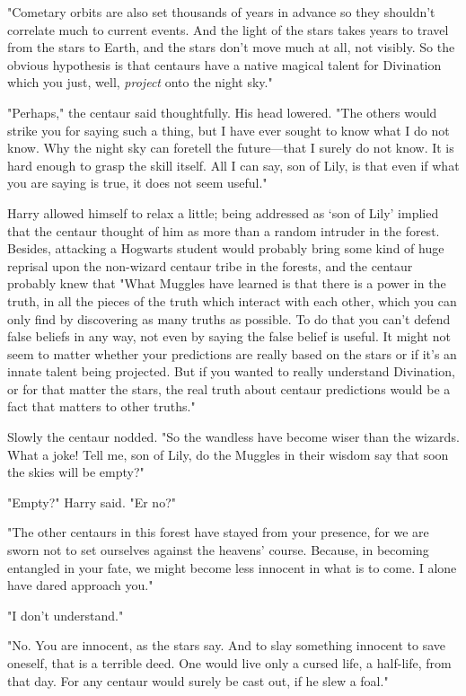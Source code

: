 "Cometary orbits are also set thousands of years in advance so they shouldn't
correlate much to current events. And the light of the stars takes years to
travel from the stars to Earth, and the stars don't move much at all, not
visibly. So the obvious hypothesis is that centaurs have a native magical
talent for Divination which you just, well, \emph{project} onto the night sky."

"Perhaps," the centaur said thoughtfully. His head lowered. "The others would
strike you for saying such a thing, but I have ever sought to know what I do
not know. Why the night sky can foretell the future—that I surely do not
know. It is hard enough to grasp the skill itself. All I can say, son of Lily,
is that even if what you are saying is true, it does not seem useful."

Harry allowed himself to relax a little; being addressed as `son of Lily'
implied that the centaur thought of him as more than a random intruder in the
forest. Besides, attacking a Hogwarts student would probably bring some kind of
huge reprisal upon the non-wizard centaur tribe in the forests, and the centaur
probably knew that{\el} "What Muggles have learned is that there is a power
in the truth, in all the pieces of the truth which interact with each other,
which you can only find by discovering as many truths as possible. To do that
you can't defend false beliefs in any way, not even by saying the false belief
is useful. It might not seem to matter whether your predictions are really
based on the stars or if it's an innate talent being projected. But if you
wanted to really understand Divination, or for that matter the stars, the real
truth about centaur predictions would be a fact that matters to other truths."

Slowly the centaur nodded. "So the wandless have become wiser than the wizards.
What a joke! Tell me, son of Lily, do the Muggles in their wisdom say that soon
the skies will be empty?"

"Empty?" Harry said. "Er{\el} no?"

"The other centaurs in this forest have stayed from your presence, for we are
sworn not to set ourselves against the heavens' course. Because, in becoming
entangled in your fate, we might become less innocent in what is to come. I
alone have dared approach you."

"I{\el} don't understand."

"No. You are innocent, as the stars say. And to slay something innocent to save
oneself, that is a terrible deed. One would live only a cursed life, a
half-life, from that day. For any centaur would surely be cast out, if he slew
a foal."

